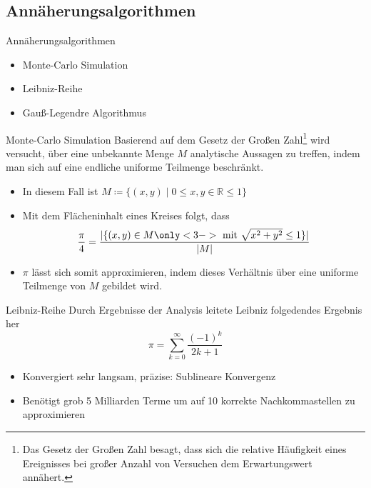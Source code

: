 \documentclass{beamer}
\begin{document}
\subsection{Annäherungsalgorithmen}

\begin{frame}{Annäherungsalgorithmen}
    \begin{itemize}
        \item Monte-Carlo Simulation
        \item Leibniz-Reihe
        \item Gauß-Legendre Algorithmus
    \end{itemize}
\end{frame}

\begin{frame}{Monte-Carlo Simulation}
    Basierend auf dem Gesetz der Großen Zahl\footnote{Das Gesetz der Großen Zahl
        besagt, dass sich die relative Häufigkeit eines Ereignisses bei großer Anzahl
        von Versuchen dem Erwartungswert annähert.
    } wird versucht, über eine unbekannte Menge \(M\) analytische Aussagen zu treffen,
    indem man sich auf eine endliche uniforme Teilmenge beschränkt.
    \begin{itemize}
        \item<1-> In diesem Fall ist \(M \coloneq \{(x, y) \mid 0 \le x,y \in \mathbb{R} \le 1\}\)
        \item<2-> Mit dem Flächeninhalt eines Kreises folgt, dass
              \begin{equation*}
                  \frac{\pi}{4} = \frac{
                      |\{(x,y) \in M \only<3->{\text{\ mit } \sqrt{x^2 + y^2} \le 1} \}|
                  }{|M|}
              \end{equation*}
        \item<4-> \(\pi\) lässt sich somit approximieren, indem dieses Verhältnis über eine uniforme Teilmenge von \(M\) gebildet wird.
    \end{itemize}
\end{frame}

\begin{frame}{Leibniz-Reihe}
    Durch Ergebnisse der Analysis leitete Leibniz folgedendes Ergebnis her \cite{Leibniz}
    \[ \pi = \sum_{k=0}^{\infty} \frac{(-1)^k}{2k+1} \]
    \begin{itemize}
        \item<3-> Konvergiert sehr langsam, präzise: Sublineare Konvergenz \\
        \item<3-> Benötigt grob 5 Milliarden Terme um auf 10 korrekte Nachkommastellen zu approximieren
    \end{itemize}
\end{frame}
\end{document}
